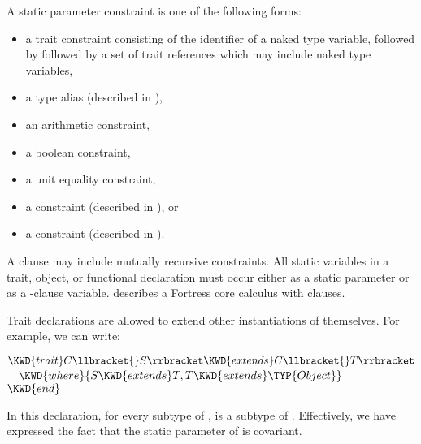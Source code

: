 A static parameter constraint is one of the following forms:
\begin{itemize}
\item a trait constraint consisting of the identifier of
a naked type variable, followed by 
followed by a set of trait references which may include naked type variables,
\item a type alias (described in ),
\item an arithmetic constraint,
\item a boolean constraint,
\item a unit equality constraint,
\item a  constraint (described in
  ), or
\item a  constraint (described in
  ).
\end{itemize}
A  clause may include mutually recursive constraints.
All static variables in a trait, object, or functional declaration must
occur either as a static parameter or as a -clause variable.
 describes a Fortress core calculus with
 clauses.

Trait declarations are allowed to extend other instantiations of
themselves. For example, we can write:
\begin{Fortress}
\(\KWD{trait} C\llbracket{}S\rrbracket \KWD{extends} C\llbracket{}T\rrbracket\)\\
{\tt~~}\pushtabs\=\+\(  \KWD{where} \{S \KWD{extends} T, T \KWD{extends} \TYP{Object}\}\)\-\\\poptabs
\(\KWD{end}\)
\end{Fortress}
In this declaration, for every subtype  of , 
is a subtype of . Effectively, we have expressed
  the fact that the static parameter  of  is covariant.


